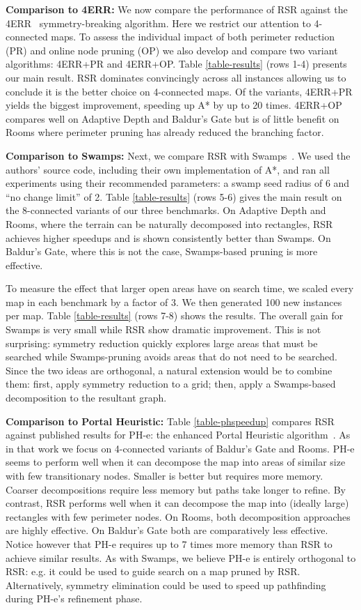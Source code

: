 \textbf{Comparison to 4ERR: }
We now compare the performance of RSR against the 4ERR~\cite{harabor10} symmetry-breaking
algorithm. Here we restrict our attention to 4-connected maps.  To
assess the individual impact of both perimeter reduction (PR) and online node
pruning (OP) we also develop and compare two variant algorithms: 4ERR+PR and
4ERR+OP. 
Table \ref{table-results} (rows 1-4) presents our main result. RSR dominates
convincingly across all instances allowing us to conclude it is the better
choice on 4-connected maps. 
Of the variants, 4ERR+PR yields the biggest improvement, speeding up A* by up to 20 times.
4ERR+OP compares well on Adaptive Depth and Baldur's Gate but is of little benefit on 
Rooms where perimeter pruning has already reduced the branching factor.
\par
\textbf{Comparison to Swamps:}
Next, we compare RSR with Swamps~\cite{pochter10}.  
We used the authors' source code, including their own implementation of A*, and 
ran all experiments using their recommended parameters: a swamp seed radius of 6 
and ``no change limit'' of 2. Table \ref{table-results} (rows 5-6) gives the main
result on the 8-connected variants of our three benchmarks.
On Adaptive Depth and Rooms, where the terrain can be naturally decomposed into
rectangles, RSR achieves higher speedups and is shown consistently better than Swamps. 
On Baldur's Gate, where this is not the case, Swamps-based pruning is more
effective. 
\par
To measure the effect that larger open areas have on search time, we scaled
every map in each benchmark by a factor of 3. We then generated 100
new instances per map. Table \ref{table-results} (rows 7-8) shows the results.  
The overall gain for Swamps is very small while RSR show dramatic improvement.
This is not surprising: symmetry reduction quickly explores large
areas that must be searched while Swamps-pruning avoids areas
that do not need to be searched.
Since the two ideas are orthogonal, a natural extension would be to combine them: 
first, apply symmetry reduction to a grid; then, apply a Swamps-based 
decomposition to the resultant graph.



\textbf{Comparison to Portal Heuristic:}
Table \ref{table-phspeedup} compares RSR against published results for PH-e: the enhanced 
Portal Heuristic algorithm~\cite{goldenberg10}.  As in that work we focus
on 4-connected variants of Baldur's Gate and Rooms.
PH-e seems to perform well when it can decompose the map into areas of similar 
size with few transitionary nodes. Smaller is better but requires
more memory. Coarser decompositions require less memory but paths take longer
to refine. 
By contrast, RSR performs well when it can decompose the map into (ideally large) 
rectangles with few perimeter nodes.
On Rooms, both decomposition approaches are highly effective. 
On Baldur's Gate both are comparatively less effective.
Notice however that PH-e requires up to 7 times more memory than RSR to achieve
similar results.
As with Swamps, we believe PH-e is entirely orthogonal to RSR: e.g.
it could be used to guide search on a map pruned by RSR. Alternatively, 
symmetry elimination could be used to speed up pathfinding during PH-e's refinement phase.

